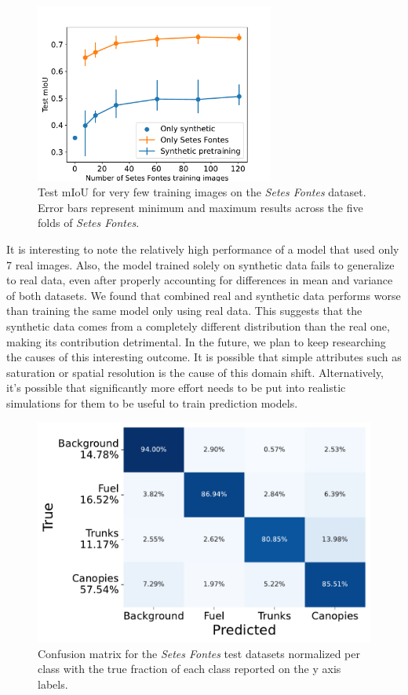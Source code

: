 \begin{figure}[H]
    \centering
    \includegraphics[width=0.7\textwidth]{figs/results/semantic_segmentation/synthetic_experiments_mious.pdf}
    \caption{Test mIoU for very few training images on the \textit{Setes Fontes} dataset.
    Error bars represent minimum and maximum results across the five folds of \textit{Setes Fontes}.}
    \label{fig:results:semantic-size-pretraining}
\end{figure}
It is interesting to note the relatively high performance of a model that used only 7 real images. Also, the model trained solely on synthetic data fails to generalize to real data, even after properly accounting for differences in mean and variance of both datasets. We found that combined real and synthetic data performs worse than training the same model only using real data. This suggests that the synthetic data comes from a completely different distribution than the real one, making its contribution detrimental. In the future, we plan to keep researching the causes of this interesting outcome. It is possible that simple attributes such as saturation or spatial resolution is the cause of this domain shift. Alternatively, it's possible that significantly more effort needs to be put into realistic simulations for them to be useful to train prediction models.
\begin{figure}[H]
    \centering
    \includegraphics[width=0.6\columnwidth]{figs/results/semantic_segmentation/confusion_matrix.pdf} 
    \caption{Confusion matrix for the \textit{Setes Fontes} test datasets normalized per class with the true fraction of each class reported on the y axis labels.
    }
    \label{fig:results:sete_fontes_confusion_matrix}
\end{figure}

